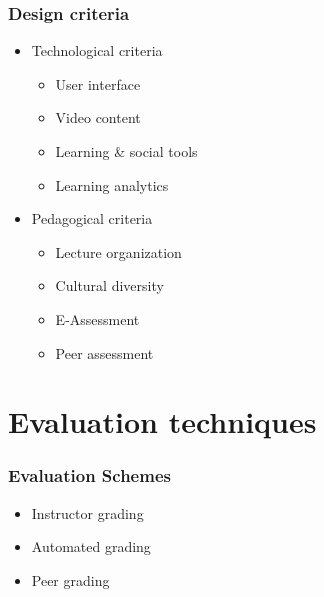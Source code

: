 \documentclass[13pt]{beamer}
\begin{document}
\begin{frame}
	\frametitle{Design criteria}
	\begin{itemize}
	 \item Technological criteria
	    \begin{itemize}
		\item User interface
		\item Video content
		\item Learning \& social tools
		\item Learning analytics
	    \end{itemize}

	 \item Pedagogical criteria
	 \begin{itemize}
		\item Lecture organization
		\item Cultural diversity
		\item E-Assessment
		\item Peer assessment
	    \end{itemize}

	\end{itemize}

\end{frame}


\section{Evaluation techniques}
\begin{frame}
	\frametitle{Evaluation Schemes}
	\begin{itemize}
	  \item Instructor grading
	  \item Automated grading
	  \item Peer grading
	\end{itemize}
\end{frame}
\end{document}

